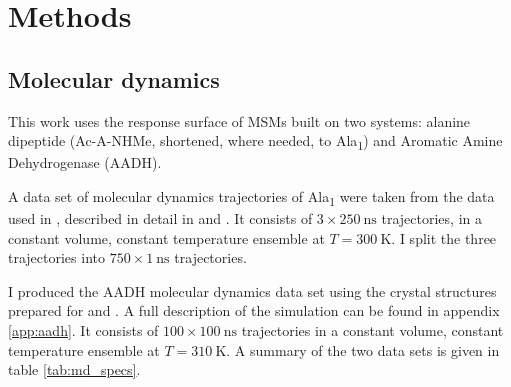 


\section{Methods}\label{sec:methods}
\subsection{Molecular dynamics}
This work uses the response surface of MSMs built on two systems: alanine dipeptide (Ac-A-NHMe, shortened, where needed, to Ala\textsubscript{1}) and Aromatic Amine Dehydrogenase (AADH). 

 A data set of molecular dynamics trajectories of Ala\textsubscript{1} were taken from the data used in \cite{wehmeyerTimelaggedAutoencodersDeep2018a}, described in detail in \cite{nuskeMarkovStateModels2017b} and \cite{harveyACEMDAcceleratingBiomolecular2009}.  It consists of $3\times \SI{250}{\nano\second}$ trajectories, in a constant volume, constant temperature ensemble at $T=\SI{300}{\kelvin}$. I split the three trajectories into $750\times\SI{1}{\nano\second}$ trajectories. 
 
 I produced the AADH molecular dynamics data set using the crystal structures prepared for \cite{masgrauAtomicDescriptionEnzyme2006} and \cite{masgrauTunnelingClassicalPaths2007}. A full description of the simulation can be found in appendix \ref{app:aadh}. It consists of $100\times \SI{100}{\nano\second}$ trajectories in a constant volume, constant temperature ensemble at $T=\SI{310}{\kelvin}$. A summary of the two data sets is given in table \ref{tab:md_specs}. 

